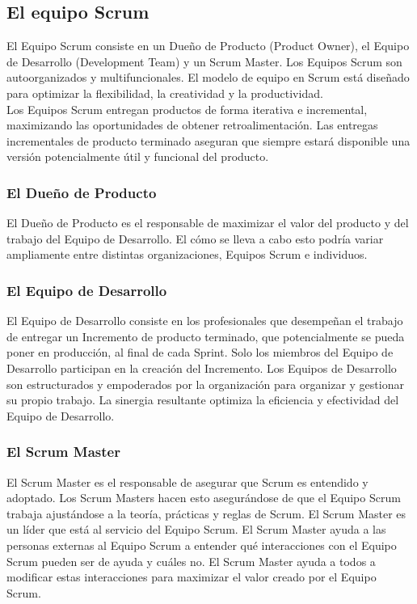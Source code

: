   \subsection{El equipo Scrum}
  El Equipo Scrum consiste en un Dueño de Producto (Product Owner), el Equipo de Desarrollo (Development Team) y un Scrum Master. Los Equipos Scrum son autoorganizados y multifuncionales. El modelo de equipo en Scrum está diseñado para optimizar la flexibilidad, la creatividad y la productividad. \\
  
  Los Equipos Scrum entregan productos de forma iterativa e incremental, maximizando las oportunidades de obtener retroalimentación. Las entregas incrementales de producto terminado aseguran que siempre estará disponible una versión potencialmente útil y funcional del producto. 
  
  \subsubsection{El Dueño de Producto}
  El Dueño de Producto es el responsable de maximizar el valor del producto y del trabajo del Equipo de Desarrollo. El cómo se lleva a cabo esto podría variar ampliamente entre distintas organizaciones, Equipos Scrum e individuos.
  
  \subsubsection{El Equipo de Desarrollo}
  El Equipo de Desarrollo consiste en los profesionales que desempeñan el trabajo de entregar un Incremento de producto terminado, que potencialmente se pueda poner en producción, al final de cada Sprint. Solo los miembros del Equipo de Desarrollo participan en la creación del Incremento. Los Equipos de Desarrollo son estructurados y empoderados por la organización para organizar y gestionar su propio trabajo. La sinergia resultante optimiza la eficiencia y efectividad del Equipo de Desarrollo.
  
  \subsubsection{El Scrum Master}
  El Scrum Master es el responsable de asegurar que Scrum es entendido y adoptado. Los Scrum Masters hacen esto asegurándose de que el Equipo Scrum trabaja ajustándose a la teoría, prácticas y reglas de Scrum. El Scrum Master es un líder que está al servicio del Equipo Scrum. El Scrum Master ayuda a las personas externas al Equipo Scrum a entender qué interacciones con el Equipo Scrum pueden ser de ayuda y cuáles no. El Scrum Master ayuda a todos a modificar estas interacciones para maximizar el valor creado por el Equipo Scrum.

